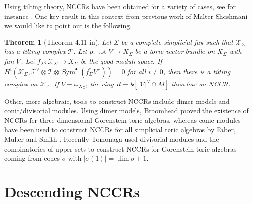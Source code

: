 \documentclass[reqno, 12pt]{amsart}
\newtheorem{theorem}{Theorem}[section]
\theoremstyle{definition}
\numberwithin{equation}{section}
\newcommand{\tot}{\operatorname{tot}}
\begin{document}
Using tilting theory, NCCRs have been obtained for a variety of cases, see for instance \cite{SVdBtoricI,SvdB17,MS25,svdbt2}. One key result in this context from previous work of Malter-Sheshmani we would like to point out is the following.
\begin{theorem}[Theorem 4.11 in\cite{MS25}]
    \label{Thm:NovaDMstack}
     Let $\Sigma$ be a complete simplicial fan such that $\mathcal{X}_\Sigma$ has a tilting complex $\mathcal{T}$. Let $p:\tot V\rightarrow X_\Sigma$ be a toric vector bundle on $X_\Sigma$ with fan $\mathcal{V}$. Let $f_\Sigma:\mathcal{X}_\Sigma\rightarrow X_\Sigma$ be the good moduli space. If $H^i(\mathcal{X}_\Sigma, \mathcal{T}^\vee\otimes\mathcal{T}\otimes \operatorname{Sym}^\bullet(f_\Sigma^\ast V^\vee))=0$ for all $i\neq 0$, then there is a tilting complex on $\mathcal{X}_{\mathcal{V}}$. If $V=\omega_{X_{\Sigma}}$, the ring $R=k[|\mathcal{V}|^\vee\cap M]$ then has an NCCR.
\end{theorem}

Other, more algebraic, tools to construct NCCRs include dimer models and conic/divisorial modules. Using dimer models, Broomhead \cite{Broomhead} proved the existence of NCCRs for three-dimensional Gorenstein toric algebras, whereas conic modules have been used to construct NCCRs for all simplicial toric algebras by Faber, Muller and Smith \cite{FMS19}. Recently Tomonaga \cite{Tomo25} used divisorial modules and the combinatorics of upper sets to construct NCCRs for Gorenstein toric algebras coming from cones $\sigma$ with $|\sigma(1)|=\dim \sigma+1$.


\section{Descending NCCRs}\label{Sec:Descent}
\end{document}
